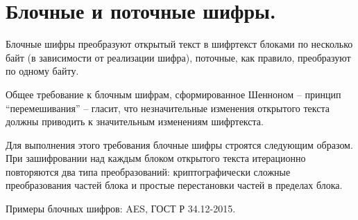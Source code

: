 \section{Блочные и поточные шифры.}

Блочные шифры преобразуют открытый текст в шифртекст блоками по несколько байт (в зависимости от реализации шифра), поточные, как правило, преобразуют по одному байту.

Общее требование к блочным шифрам, сформированное Шенноном -- принцип “перемешивания” -- гласит, что незначительные изменения открытого текста должны приводить к значительным изменениям шифртекста.

Для выполнения этого требования блочные шифры строятся следующим образом. При зашифровании над каждым блоком открытого текста итерационно повторяются два типа преобразований: криптографически сложные преобразования частей блока и простые перестановки частей в пределах блока.

Примеры блочных шифров: AES, ГОСТ Р 34.12-2015.